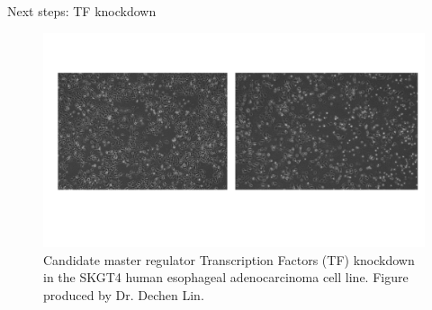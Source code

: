 \documentclass[slidestop,compress,11pt,xcolor=dvipsnames]{beamer}
\begin{document}
\begin{frame}{Next steps: TF knockdown}
 \begin{figure}[ht!]
  \centering
  \includegraphics[width=1.0\textwidth]{glioma/knockdown_TF_ESCA.pdf}
  \caption{Candidate master regulator Transcription Factors (TF) knockdown in the SKGT4 human esophageal adenocarcinoma cell line. Figure produced by Dr. Dechen Lin.}
 \end{figure}
\end{frame}
\end{document}
